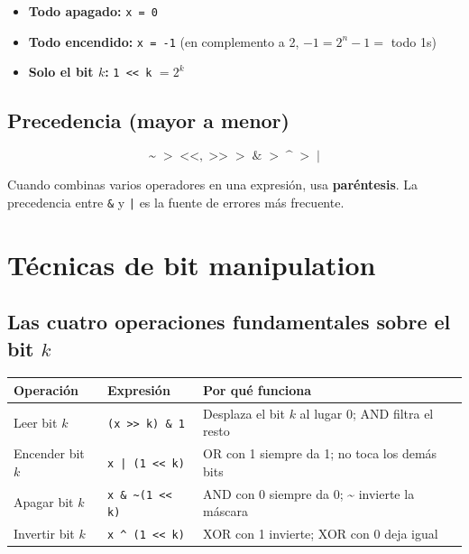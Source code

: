 \documentclass[12pt, oneside]{article}
\begin{document}
\begin{itemize}
  \item \textbf{Todo apagado:} \texttt{x = 0}
  \item \textbf{Todo encendido:} \texttt{x = -1}
        (en complemento a 2, $-1 = 2^n - 1 = $ todo 1s)
  \item \textbf{Solo el bit $k$:} \texttt{1 << k} \;$= 2^k$
\end{itemize}

\subsection{Precedencia (mayor a menor)}

\[
  \texttt{\textasciitilde}
  \;>\;
  \texttt{<<},\;\texttt{>>}
  \;>\;
  \texttt{\&}
  \;>\;
  \texttt{\textasciicircum}
  \;>\;
  \texttt{|}
\]

\begin{consejo}
  Cuando combinas varios operadores en una expresión, usa
  \textbf{paréntesis}. La precedencia entre \texttt{\&} y \texttt{|}
  es la fuente de errores más frecuente.
\end{consejo}

\newpage

\section{Técnicas de bit manipulation}

\subsection{Las cuatro operaciones fundamentales sobre el bit $k$}

\begin{center}
\begin{tabular}{lll}
  \toprule
  \textbf{Operación} & \textbf{Expresión} & \textbf{Por qué funciona} \\
  \midrule
  Leer bit $k$     & \texttt{(x >> k) \& 1}
    & Desplaza el bit $k$ al lugar 0; AND filtra el resto \\[4pt]
  Encender bit $k$ & \texttt{x | (1 << k)}
    & OR con 1 siempre da 1; no toca los demás bits \\[4pt]
  Apagar bit $k$   & \texttt{x \& \textasciitilde(1 << k)}
    & AND con 0 siempre da 0; \textasciitilde{} invierte la máscara \\[4pt]
  Invertir bit $k$ & \texttt{x \textasciicircum{} (1 << k)}
    & XOR con 1 invierte; XOR con 0 deja igual \\
  \bottomrule
\end{tabular}
\end{center}
\end{document}
